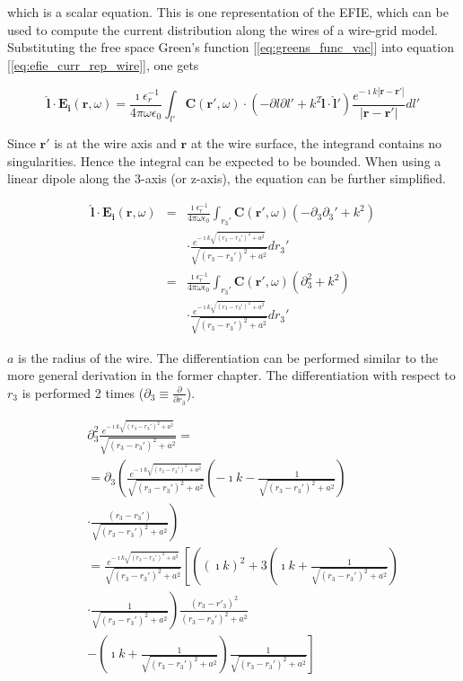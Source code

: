 \documentclass[a4paper,11pt]{thesis}
\begin{document}
which is a scalar equation. This is one representation of the EFIE, which can be used to compute the current distribution along the wires of a wire-grid model. Substituting the free space Green's function [\ref{eq:greens_func_vac}] into equation [\ref{eq:efie_curr_rep_wire}], one gets

\begin{equation}
  \mathbf{\hat{l}} \cdot \mathbf{E_i}(\mathbf{r},\omega)
 =  \frac{\imath \epsilon_r^{-1}}{4 \pi \omega \epsilon_0} \int_{l'}   \mathbf{C}(\mathbf{r'},\omega)\cdot \left(  -\partial l  \partial l'   + k^2  \mathbf{\hat{l}} \cdot \mathbf{\hat{l}'} \right)  \frac{e^{- \imath k  | \mathbf{r}-\mathbf{r'} |}}{| \mathbf{r}-\mathbf{r'} |} dl'
\end{equation}

Since $\mathbf{r'}$ is at the wire axis and $\mathbf{r}$ at the wire surface, the integrand contains no singularities. Hence the integral can be expected to be bounded. When using a linear dipole along the 3-axis (or z-axis), the equation can be further simplified.

\begin{eqnarray} \label{eq:efie}
  \mathbf{\hat{l}} \cdot \mathbf{E_i}(\mathbf{r},\omega)
 &=&  \frac{\imath \epsilon_r^{-1}}{4 \pi \omega \epsilon_0} \int_{r_3'}   \mathbf{C}(\mathbf{r'},\omega) \left(  -\partial_3  \partial_3'   + k^2   \right)  \\
 && \cdot \frac{e^{- \imath k  \sqrt{(r_3-r_3')^2+a^2}}}{\sqrt{(r_3-r_3')^2+a^2} } dr_3' \nonumber \\
&=&  \frac{\imath \epsilon_r^{-1}}{4 \pi \omega \epsilon_0} \int_{r_3'}   \mathbf{C}(\mathbf{r'},\omega) \left(  \partial^2_3   + k^2   \right) \nonumber \\
&& \cdot \frac{e^{- \imath k  \sqrt{(r_3-r_3')^2+a^2}}}{\sqrt{(r_3-r_3')^2+a^2} } dr_3' \nonumber
\end{eqnarray}

$a$ is the radius of the wire. The differentiation can be performed similar to the more general derivation in the former chapter. The differentiation with respect to $r_3$ is performed 2 times ($\partial_3 \equiv \frac{\partial}{\partial r_3}$).

\begin{eqnarray}
&& \partial^2_3 \frac{e^{- \imath k  \sqrt{(r_3-r_3')^2+a^2}}}{\sqrt{(r_3-r_3')^2+a^2} }=\\
&&=\partial_3 \left( \frac{   e^{- \imath k  \sqrt{(r_3-r_3')^2+a^2}}}{ \sqrt{(r_3-r_3')^2+a^2}} \left( -\imath k -\frac{1}{\sqrt{(r_3-r_3')^2+a^2}}\right)\right.\nonumber\\
&&\left.\cdot\frac{(r_3-r_3')}{\sqrt{(r_3-r_3')^2+a^2}}\right)\nonumber\\
&& =\frac{e^{- \imath k \sqrt{(r_3-r_3')^2+a^2}}}{\sqrt{(r_3-r_3')^2+a^2}}\left[ \left( ( \imath k)^2+ 3 \left( \imath k + \frac{1}{\sqrt{(r_3-r_3')^2+a^2}} \right)\right. \right.  \nonumber \\
&& \left. \cdot \frac{1}{\sqrt{(r_3-r_3')^2+a^2}} \right) \frac{(r_3-r'_3)^2}{(r_3-r_3')^2+a^2}\nonumber\\
&&- \left.\left(   \imath k+ \frac{1}{\sqrt{(r_3-r_3')^2+a^2}}\right)  \frac{1}{\sqrt{(r_3-r_3')^2+a^2}} \right] \nonumber
\end{eqnarray}
\end{document}
